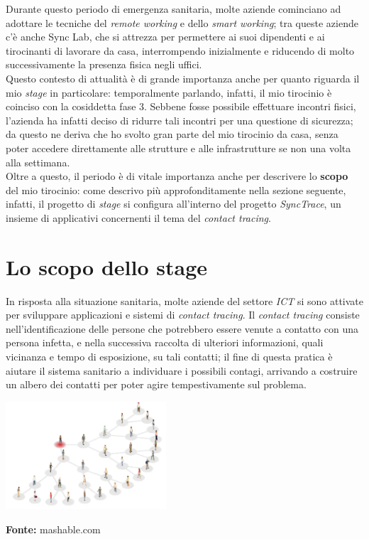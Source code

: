 Durante questo periodo di emergenza sanitaria, molte aziende cominciano ad adottare le tecniche del \textit{remote working} e dello \textit{smart working}; tra queste aziende c'è anche Sync Lab, che si attrezza per permettere ai suoi dipendenti e ai tirocinanti di lavorare da casa, interrompendo inizialmente e riducendo di molto successivamente la presenza fisica negli uffici. \\
Questo contesto di attualità è di grande importanza anche per quanto riguarda il mio \textit{stage} in particolare: temporalmente parlando, infatti, il mio tirocinio è coinciso con la cosiddetta fase 3. Sebbene fosse possibile effettuare incontri fisici, l'azienda ha infatti deciso di ridurre tali incontri per una questione di sicurezza; da questo ne deriva che ho svolto gran parte del mio tirocinio da casa, senza poter accedere direttamente alle strutture e alle infrastrutture se non una volta alla settimana. \\
Oltre a questo, il periodo è di vitale importanza anche per descrivere lo \textbf{scopo} del mio tirocinio: come descrivo più approfonditamente nella sezione seguente, infatti, il progetto di \textit{stage} si configura all'interno del progetto \textit{SyncTrace}, un insieme di applicativi concernenti il tema del \textit{contact tracing}.


\section{Lo scopo dello stage}

In risposta alla situazione sanitaria, molte aziende del settore \textit{ICT} si sono attivate per sviluppare applicazioni e sistemi di \textit{contact tracing}. Il \textit{contact tracing} consiste nell'identificazione delle persone che potrebbero essere venute a contatto con una persona infetta, e nella successiva raccolta di ulteriori informazioni, quali vicinanza e tempo di esposizione, su tali contatti; il fine di questa pratica è aiutare il sistema sanitario a individuare i possibili contagi, arrivando a costruire un albero dei contatti per poter agire tempestivamente sul problema. \\

\begin{minipage}{\linewidth}
  \centering
    \includegraphics[height=4cm]{immagini/contacttracing}
  \caption*{\textbf{Fonte:} mashable.com}
\end{minipage} \\

